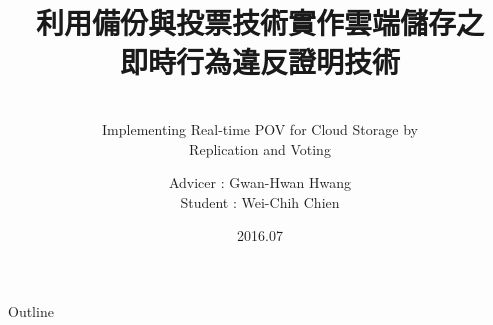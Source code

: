 \documentclass[utf8]{beamer}
\title[Oral Presentation]{利用備份與投票技術實作雲端儲存之\\ 即時行為違反證明技術}
\subtitle{~\\ Implementing Real-time POV for Cloud Storage by\\ Replication and Voting}
\author[Wei-Chih Chien]{Advicer : Gwan-Hwan Hwang \texorpdfstring{\\ Student : Wei-Chih Chien}{}}
\institute[NTNU CSIE CCLAB]{NTNU CSIE CCLAB}
\date{2016.07}
\begin{document}
\begin{frame}
  \titlepage
\end{frame}

\begin{frame}{Outline}
  \tableofcontents
\end{frame}






\end{document}

